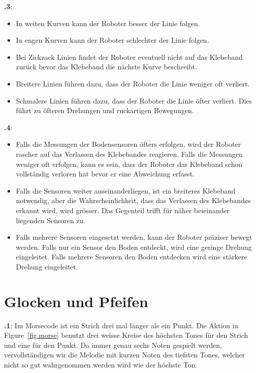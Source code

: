 \documentclass[12pt,a4paper]{article}
\begin{document}
\textbf{\thesection.3}:
\begin{itemize}
\item In weiten Kurven kann der Roboter besser der Linie folgen.
\item In engen Kurven kann der Roboter schlechter der Linie folgen.
\item Bei Zickzack Linien findet der Roboter eventuell nicht auf das Klebeband zurück bevor das Klebeband die nächste Kurve beschreibt.
\item Breitere Linien führen dazu, dass der Roboter die Linie weniger oft verliert.
\item Schmalere Linien führen dazu, dass der Roboter die Linie öfter verliert. Dies führt zu öfteren Drehungen und ruckartigen Bewegungen.
\end{itemize}


\textbf{\thesection.4}:
\begin{itemize}
\item Falls die Messungen der Bodensensoren öfters erfolgen, wird der Roboter rascher auf das Verlassen des Klebebandes reagieren. Falls die Messungen weniger oft erfolgen, kann es sein, dass der Roboter das Klebeband schon vollständig verloren hat bevor er eine Abweichung erfasst.
\item Falls die Sensoren weiter auseinanderliegen, ist ein breiteres Klebeband notwendig, aber die Wahrscheinlichkeit, dass das Verlassen des Klebebandes erkannt wird, wird grösser. Das Gegenteil trifft für näher beieinander liegenden Sensoren zu.
\item Falls mehrere Sensoren eingesetzt werden, kann der Roboter präziser bewegt werden. Falls nur ein Sensor den Boden entdeckt, wird eine geringe Drehung eingeleitet. Falls mehrere Sensoren den Boden entdecken wird eine stärkere Drehung eingeleitet.
\end{itemize}


\section{Glocken und Pfeifen}

\textbf{\thesection.1}:
Im Morsecode ist ein Strich drei mal länger als ein Punkt. Die Aktion in Figure~\ref{fig.morse} benutzt drei weisse Kreise des höchsten Tones für den Strich und eine für den Punkt. Da immer genau sechs Noten gespielt werden, vervollständigen wir die Melodie mit kurzen Noten des tiefsten Tones, welcher nicht so gut wahrgenommen werden wird wie der höchste Ton.
\end{document}
